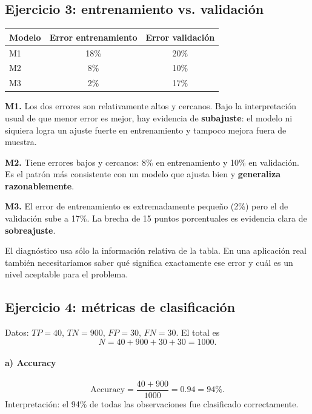 \documentclass[11pt]{article}
\begin{document}
\subsection{Ejercicio 3: entrenamiento vs. validación}

\begin{center}
\begin{tabular}{lcc}
\toprule
Modelo & Error entrenamiento & Error validación\\
\midrule
M1 & 18\% & 20\%\\
M2 & 8\% & 10\%\\
M3 & 2\% & 17\%\\
\bottomrule
\end{tabular}
\end{center}

\textbf{M1.} Los dos errores son relativamente altos y cercanos. Bajo la interpretación usual de que menor error es mejor, hay evidencia de \textbf{subajuste}: el modelo ni siquiera logra un ajuste fuerte en entrenamiento y tampoco mejora fuera de muestra.

\textbf{M2.} Tiene errores bajos y cercanos: 8\% en entrenamiento y 10\% en validación. Es el patrón más consistente con un modelo que ajusta bien y \textbf{generaliza razonablemente}.

\textbf{M3.} El error de entrenamiento es extremadamente pequeño (2\%) pero el de validación sube a 17\%. La brecha de 15 puntos porcentuales es evidencia clara de \textbf{sobreajuste}.

\begin{advertencia}
El diagnóstico usa sólo la información relativa de la tabla. En una aplicación real también necesitaríamos saber qué significa exactamente ese error y cuál es un nivel aceptable para el problema.
\end{advertencia}

\subsection{Ejercicio 4: métricas de clasificación}
Datos: $TP=40$, $TN=900$, $FP=30$, $FN=30$. El total es
\[
N=40+900+30+30=1000.
\]

\paragraph{a) Accuracy}
\[
\mathrm{Accuracy}=\frac{40+900}{1000}=0.94=94\%.
\]
Interpretación: el 94\% de todas las observaciones fue clasificado correctamente.
\end{document}
